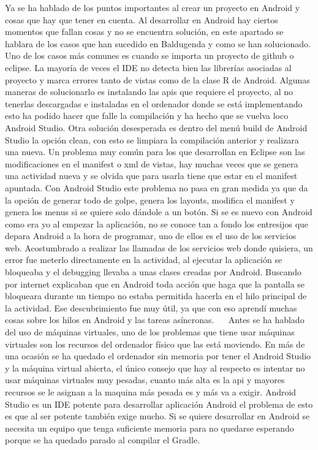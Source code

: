 Ya se ha hablado de los puntos importantes al crear un proyecto en Android y cosas que hay que tener en cuenta. 
Al desarrollar en Android hay ciertos momentos que fallan cosas y no se encuentra solución, en este apartado se hablara de los casos que han sucedido en Baldugenda y como se han solucionado.
Uno de los casos más comunes es cuando se importa un proyecto de github o eclipse. La mayoría de veces el IDE no detecta bien las librerías asociadas al proyecto y marca errores tanto de vistas como de la clase R de Android. 
Algunas maneras de solucionarlo es instalando las apis que requiere el proyecto, al no tenerlas descargadas e instaladas en el ordenador donde se está implementando esto ha podido hacer que falle la compilación y ha hecho que se vuelva loco Android Studio.
Otra solución desesperada es dentro del menú build de Android Studio la opción clean, con esto se limpiara la compilación anterior y realizara una nueva.
Un problema muy común para los que desarrollan en Eclipse son las modificaciones en el manifest o xml de vistas, hay muchas veces que se genera una actividad nueva y se olvida que para usarla tiene que estar en el manifest apuntada.
Con Android Studio este problema no pasa en gran medida ya que da la opción de generar todo de golpe, genera los layouts, modifica el manifest y genera los menus si se quiere solo dándole a un botón.
Si se es nuevo con Android como era yo al empezar la aplicación, no se conoce tan a fondo los entresijos  que depara Android a la hora de programar, uno de ellos es el uso de los servicios web.
Acostumbrado a realizar las llamadas de los servicios web donde quisiera, un error fue meterlo directamente en la actividad, al ejecutar la aplicación se bloqueaba y el debugging llevaba a unas clases creadas por Android.
Buscando por internet explicaban que en Android toda acción que haga que la pantalla se bloqueara durante un tiempo no estaba permitida hacerla en el hilo principal de la actividad.
Ese descubrimiento fue muy útil, ya que con eso aprendí  muchas cosas sobre los hilos en Android y las tareas asíncronas.
 
Antes se ha hablado del uso de máquinas virtuales, uno de los problemas que tiene usar máquinas virtuales son los recursos del ordenador físico que las está moviendo. En más de una ocasión se ha quedado el ordenador sin memoria por tener el Android Studio y la máquina virtual abierta, el único consejo que hay al respecto es intentar no usar máquinas virtuales muy pesadas, cuanto más alta es la api y mayores recursos se le asignan a la maquina más pesada es y más va a exigir.
Android Studio es un IDE potente para desarrollar aplicación Android el problema de esto es que al ser potente también exige mucho. Si se quiere desarrollar en Android se necesita un equipo que tenga suficiente memoria para no quedarse esperando porque se ha quedado parado al compilar el Gradle.

